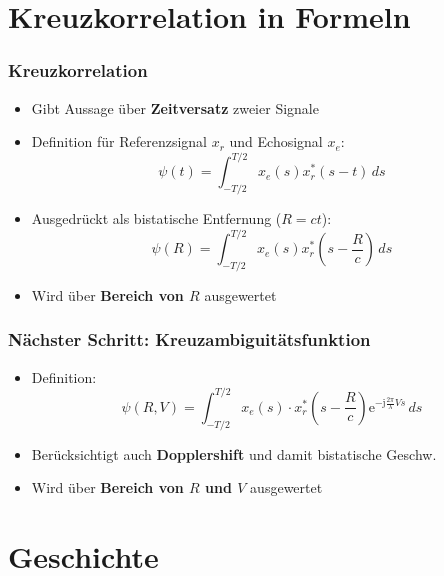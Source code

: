 \section{Kreuzkorrelation in Formeln}

\begin{frame}
    \frametitle{Kreuzkorrelation}

    \begin{itemize}
        \item Gibt Aussage über \textbf{Zeitversatz} zweier Signale
        \item Definition für Referenzsignal \(x_{r}\) und Echosignal \(x_{e}\):
              \begin{equation}
                  \psi(t) = \int_{-T/2}^{T/2}{ x_{e}(s) x_{r}^{*}(s - t) \, d s}
              \end{equation}
        \item<2-> Ausgedrückt als bistatische Entfernung (\(R = c t\)):
              \begin{equation}
                  \psi(R) = \int_{-T/2}^{T/2}{ x_{e}(s) x_{r}^{*} \left( s - \frac{R}{c} \right) \, d s}
              \end{equation}
        \item<3-> Wird über \textbf{Bereich von \(R\)} ausgewertet
    \end{itemize}
\end{frame}

\begin{frame}
    \frametitle{Nächster Schritt: Kreuzambiguitätsfunktion}

    \begin{itemize}
        \item Definition:
              \begin{equation}
                  \psi(R, V) = \int_{-T/2}^{T/2} {x_{e}(s) \cdot x_{r}^{*}} \left( s - \frac{R}{c} \right)\mathrm{e}^{- \mathrm{j} \frac{2 \pi}{\lambda} V s} \, d s
              \end{equation}
        \item Berücksichtigt auch \textbf{Dopplershift} und damit bistatische Geschw.
        \item Wird über \textbf{Bereich von \(R\) und \(V\)} ausgewertet
    \end{itemize}
\end{frame}

\section{Geschichte}


